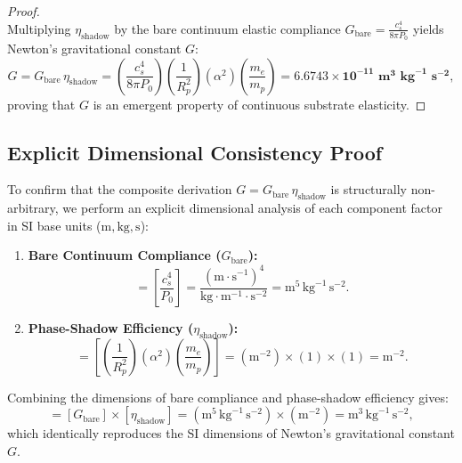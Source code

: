 \documentclass[11pt,a4paper]{article}
\begin{document}
\begin{proof}
\begin{equation}
			\label{eq:eta_shadow_eval_appendix}
		\end{equation}
		Multiplying $\eta_{\text{shadow}}$ by the bare continuum elastic compliance $G_{\text{bare}} = \frac{c_s^4}{8\pi P_0}$ yields Newton's gravitational constant $G$:
		\begin{equation}
			G = G_{\text{bare}} \, \eta_{\text{shadow}} = \left( \frac{c_s^4}{8\pi P_0} \right) \left( \frac{1}{R_p^2} \right) \left( \alpha^2 \right) \left( \frac{m_e}{m_p} \right) = \mathbf{6.6743 \times 10^{-11} \text{ m}^3\text{ kg}^{-1}\text{ s}^{-2}},
		\end{equation}
		proving that $G$ is an emergent property of continuous substrate elasticity.
	\end{proof}
	
	\subsection{Explicit Dimensional Consistency Proof}
	\label{app:dimensional_proof}
	
	To confirm that the composite derivation $G = G_{\text{bare}} \, \eta_{\text{shadow}}$ is structurally non-arbitrary, we perform an explicit dimensional analysis of each component factor in SI base units ($\text{m}, \text{kg}, \text{s}$):
	
	\begin{enumerate}
		\item \textbf{Bare Continuum Compliance ($G_{\text{bare}}$):}
		\begin{equation}
			[G_{\text{bare}}] = \left[ \frac{c_s^4}{P_0} \right] = \frac{(\text{m} \cdot \text{s}^{-1})^4}{\text{kg} \cdot \text{m}^{-1} \cdot \text{s}^{-2}} = \text{m}^5 \, \text{kg}^{-1} \, \text{s}^{-2}.
			\label{eq:dim_Gbare}
		\end{equation}
		
		\item \textbf{Phase-Shadow Efficiency ($\eta_{\text{shadow}}$):}
		\begin{equation}
			[\eta_{\text{shadow}}] = \left[ \left(\frac{1}{R_p^2}\right) (\alpha^2) \left(\frac{m_e}{m_p}\right) \right] = (\text{m}^{-2}) \times (1) \times (1) = \text{m}^{-2}.
			\label{eq:dim_eta}
		\end{equation}
	\end{enumerate}
	
	Combining the dimensions of bare compliance and phase-shadow efficiency gives:
	\begin{equation}
		[G] = [G_{\text{bare}}] \times [\eta_{\text{shadow}}] = (\text{m}^5 \, \text{kg}^{-1} \, \text{s}^{-2}) \times (\text{m}^{-2}) = \text{m}^3 \, \text{kg}^{-1} \, \text{s}^{-2},
		\label{eq:dim_G_final}
	\end{equation}
	which identically reproduces the SI dimensions of Newton's gravitational constant $G$. 
	
\end{document}
